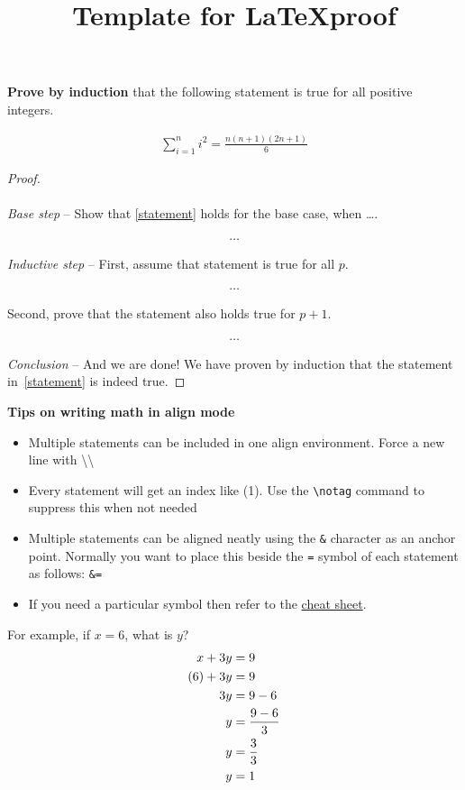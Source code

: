 \documentclass{article}
\title{Template for \LaTeX proof}
\date{}
\begin{document}
\maketitle

\textbf{Prove by induction} that the following statement is true for all positive integers.

\begin{align}
    \label{statement}
    \sum_{i=1}^{n} i^2 = \frac{n(n+1)(2n+1)}{6}
\end{align}

\begin{proof}

\textit{\\\\Base step} -- Show that \cref{statement} holds for the base case, when \dots.

\begin{align}
    \label{basestep}
    \dots
\end{align}

\textit{Inductive step} -- First, assume that statement is true for all $p$.

\begin{align}
    \label{assumption}
    \dots
\end{align}

Second, prove that the statement also holds true for $p+1$.

\begin{align}
    \label{proof}
    \dots
\end{align}

\textit{Conclusion} -- And we are done! We have proven by induction that the statement in~\cref{statement} is indeed true.

\end{proof}

\textbf{Tips on writing math in align mode}
\begin{itemize}
    \item Multiple statements can be included in one align environment. Force a new line with \textbackslash\textbackslash
    \item Every statement will get an index like (1). Use the \texttt{\textbackslash notag} command to suppress this when not needed
    \item Multiple statements can be aligned neatly using the \texttt{\&} character as an anchor point. Normally you want to place this beside the \texttt{=} symbol of each statement as follows: \texttt{\&=}
    \item If you need a particular symbol then refer to the \href{http://tug.ctan.org/info/undergradmath/undergradmath.pdf}{cheat sheet}.
\end{itemize}

For example, if $x=6$, what is $y$?
\begin{align}
    x + 3y &= 9 \notag\\
    (6) + 3y &= 9 \notag\\
    3y &= 9 - 6 \notag\\
    y &= \frac{9 - 6}{3} \notag\\
    y &= \frac{3}{3} \notag\\
    y &= 1 \notag
\end{align}
\end{document}
